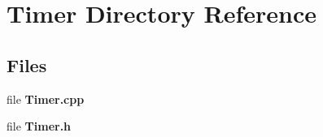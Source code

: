\section{Timer Directory Reference}
\label{dir_2aaa16b7b1cb3055e18a6b2b26c8d104}
\subsection*{Files}
\begin{DoxyCompactItemize}
\item 
file {\bfseries Timer.\+cpp}
\item 
file {\bfseries Timer.\+h}
\end{DoxyCompactItemize}
